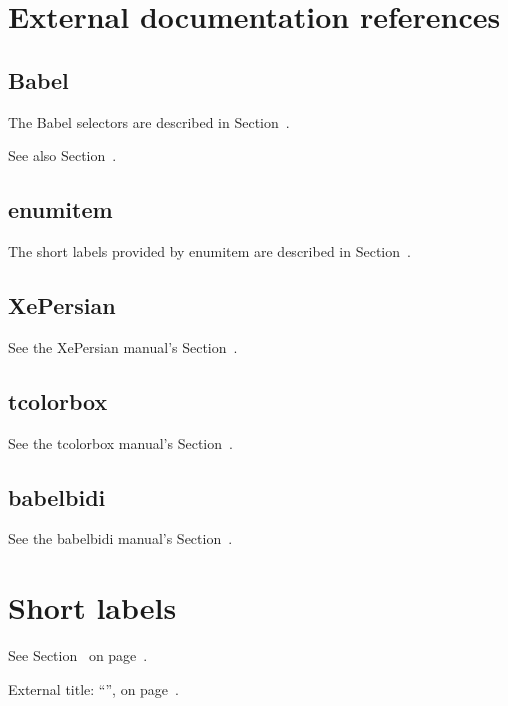 \documentclass{article}
\begin{document}
    
    \section{External documentation references}
    
    \subsection{Babel}
    
    The Babel selectors are described in
    Section~.
    
    See also Section~.
    
    \subsection{enumitem}
    
    The short labels provided by enumitem are described in
    Section~.
    
    \subsection{XePersian}
    
    See the XePersian manual's
    Section~.
    
    \subsection{tcolorbox}
    
    See the tcolorbox manual's
    Section~.
    
    \subsection{babelbidi}
    
    See the babelbidi manual's
    Section~.
    
    \section{Short labels}\label{sec:short-labels}
    
    See Section~
    on page~\pageref{sec:short-labels}.

    External title: ``'',
    on page~.
    
\end{document}
